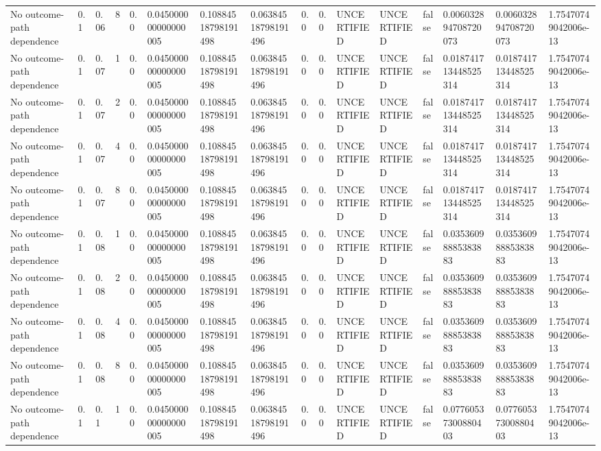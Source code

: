 \begin{tabular}{llllllllllllllll}
No outcome-path dependence & 0.1 & 0.06 & 8 & 0.0 & 0.045000000000000005 & 0.10884518798191498 & 0.06384518798191496 & 0.0 & 0.0 & UNCERTIFIED & UNCERTIFIED & false & 0.006032894708720073 & 0.006032894708720073 & 1.75470749042006e-13 \\
No outcome-path dependence & 0.1 & 0.07 & 1 & 0.0 & 0.045000000000000005 & 0.10884518798191498 & 0.06384518798191496 & 0.0 & 0.0 & UNCERTIFIED & UNCERTIFIED & false & 0.018741713448525314 & 0.018741713448525314 & 1.75470749042006e-13 \\
No outcome-path dependence & 0.1 & 0.07 & 2 & 0.0 & 0.045000000000000005 & 0.10884518798191498 & 0.06384518798191496 & 0.0 & 0.0 & UNCERTIFIED & UNCERTIFIED & false & 0.018741713448525314 & 0.018741713448525314 & 1.75470749042006e-13 \\
No outcome-path dependence & 0.1 & 0.07 & 4 & 0.0 & 0.045000000000000005 & 0.10884518798191498 & 0.06384518798191496 & 0.0 & 0.0 & UNCERTIFIED & UNCERTIFIED & false & 0.018741713448525314 & 0.018741713448525314 & 1.75470749042006e-13 \\
No outcome-path dependence & 0.1 & 0.07 & 8 & 0.0 & 0.045000000000000005 & 0.10884518798191498 & 0.06384518798191496 & 0.0 & 0.0 & UNCERTIFIED & UNCERTIFIED & false & 0.018741713448525314 & 0.018741713448525314 & 1.75470749042006e-13 \\
No outcome-path dependence & 0.1 & 0.08 & 1 & 0.0 & 0.045000000000000005 & 0.10884518798191498 & 0.06384518798191496 & 0.0 & 0.0 & UNCERTIFIED & UNCERTIFIED & false & 0.03536098885383883 & 0.03536098885383883 & 1.75470749042006e-13 \\
No outcome-path dependence & 0.1 & 0.08 & 2 & 0.0 & 0.045000000000000005 & 0.10884518798191498 & 0.06384518798191496 & 0.0 & 0.0 & UNCERTIFIED & UNCERTIFIED & false & 0.03536098885383883 & 0.03536098885383883 & 1.75470749042006e-13 \\
No outcome-path dependence & 0.1 & 0.08 & 4 & 0.0 & 0.045000000000000005 & 0.10884518798191498 & 0.06384518798191496 & 0.0 & 0.0 & UNCERTIFIED & UNCERTIFIED & false & 0.03536098885383883 & 0.03536098885383883 & 1.75470749042006e-13 \\
No outcome-path dependence & 0.1 & 0.08 & 8 & 0.0 & 0.045000000000000005 & 0.10884518798191498 & 0.06384518798191496 & 0.0 & 0.0 & UNCERTIFIED & UNCERTIFIED & false & 0.03536098885383883 & 0.03536098885383883 & 1.75470749042006e-13 \\
No outcome-path dependence & 0.1 & 0.1 & 1 & 0.0 & 0.045000000000000005 & 0.10884518798191498 & 0.06384518798191496 & 0.0 & 0.0 & UNCERTIFIED & UNCERTIFIED & false & 0.07760537300880403 & 0.07760537300880403 & 1.75470749042006e-13 \\

\end{tabular}
